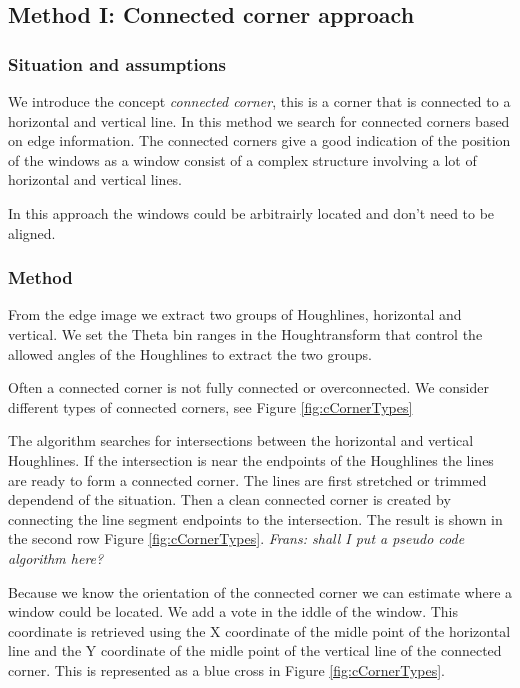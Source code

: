 \subsection{Method I: Connected corner approach} 
\subsubsection{Situation and assumptions}
We introduce the concept \emph{connected corner}, this is a corner that is 
connected to a horizontal and vertical line.  
In this method we search for connected corners based on edge information.
The connected corners give a good indication of the position of the windows as 
a window consist of a complex structure involving a lot of horizontal and vertical lines.

In this approach the windows could be arbitrairly located and don't need
to be aligned.

\subsubsection{Method}
From the edge image we extract two groups of Houghlines, horizontal and
vertical.  We set the Theta bin ranges in the Houghtransform that control the
allowed angles of the Houghlines to extract the two groups.

Often a connected corner is not fully connected or overconnected.
We consider different types of connected corners, see Figure \ref{fig:cCornerTypes} 

The algorithm searches for intersections between the horizontal and vertical
Houghlines.  If the intersection is near the endpoints of the Houghlines the
lines are ready to form a connected corner.  The lines are first stretched or
trimmed dependend of the situation. Then a clean connected corner is created by
connecting the line segment endpoints to the intersection.
The result is shown in the second row Figure \ref{fig:cCornerTypes}.
\emph{Frans: shall I put a pseudo code algorithm here?}

Because we know the orientation of the connected corner we can estimate where
a window could be located.  We add a vote in the iddle of the window. This
coordinate is retrieved using the X coordinate of the midle point of the horizontal line
and the Y coordinate of the midle point of the vertical line of the connected corner.  
This is represented as a blue cross in Figure \ref{fig:cCornerTypes}.

